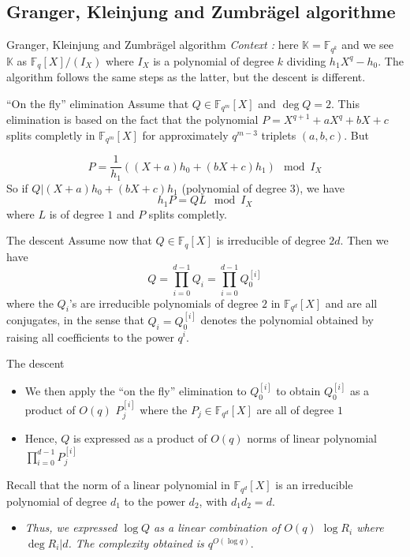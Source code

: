 \documentclass[xcolor=x11names,compress]{beamer}
\theoremstyle{break}
\theoremstyle{sc}
\theoremstyle{definition}
\theoremstyle{remark}
\begin{document}
\subsection{Granger, Kleinjung and Zumbrägel algorithme}

\begin{frame}{Granger, Kleinjung and Zumbrägel algorithm}
  \emph{Context :} here $\mathbb{K}=\mathbb{F}_{q^k}$ and we see $\mathbb{K}$ as
  $\mathbb{F}_q[X]/(I_X)$ where $I_X$ is a polynomial of degree $k$ dividing
  $h_1X^q-h_0$. The algorithm follows the same steps as the latter, but the
  descent is different.
\end{frame}

\begin{frame}{``On the fly'' elimination}
  Assume that $Q\in \mathbb{F}_{q^m}[X]$ and $\deg Q = 2$. This elimination is
  based on the fact that the polynomial $P = X^{q+1}+aX^q+bX+c$ splits completly
  in $\mathbb{F}_{q^m}[X]$ for approximately $q^{m-3}$ triplets $(a, b, c)$. But
  
  \[
    P = \frac{1}{h_1}((X+a)h_0 + (bX+c)h_1)\mod I_X
  \]
  So if $Q| (X+a)h_0 + (bX+c)h_1$ (polynomial of degree $3$), we have 
  \[
    h_1P=QL \mod I_X
  \]
  where $L$ is of degree $1$ and $P$ splits completly.

\end{frame}

\begin{frame}{The descent}
  Assume now that $Q\in\mathbb{F}_{q}[X]$ is irreducible of degree $2d$. Then we
  have
  \[
    Q=\prod_{i=0}^{d-1} Q_i = \prod_{i=0}^{d-1}Q_0^{[i]}
  \]
  where the $Q_i$'s are irreducible polynomials of degree $2$ in
  $\mathbb{F}_{q^d}[X]$ and are all conjugates, in the sense that
  $Q_i=Q_0^{[i]}$ denotes the polynomial obtained by raising all coefficients to
  the power $q^i$.
\end{frame}
  
\begin{frame}{The descent}
  \begin{itemize}
    \item We then apply the ``on the fly''
      elimination to $Q_0^{[i]}$ to obtain $Q_0^{[i]}$ as a product of 
      $O(q)$ $P_j^{[i]}$ where the $P_j\in \mathbb{F}_{q^d}[X]$ are all of degree $1$
    \item Hence, $Q$ is expressed as a product of $O(q)$ norms of linear polynomial
      $\prod_{i=0}^{d-1}P_j^{[i]}$
  \end{itemize}
  
  Recall that the norm of a linear polynomial in $\mathbb{F}_{q^d}[X]$ is an irreducible
  polynomial of degree $d_1$ to the power $d_2$, with $d_1d_2 = d$.
  \begin{itemize}
    \item \emph{Thus, we expressed $\log Q$ as a linear combination of $O(q)$ $\log
        R_i$ where $\deg R_i | d$. The complexity obtained is $q^{O(\log q)}$}.
  \end{itemize}
\end{frame}

\end{document}
